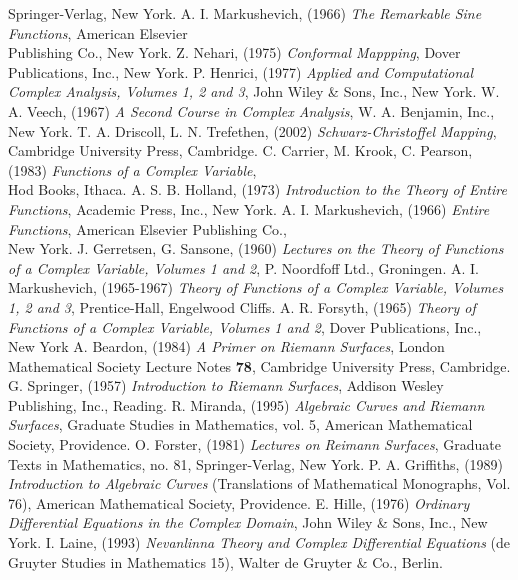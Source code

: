 \documentclass[11pt]{gthesis2}  %
\begin{document}
\begin{thebibliography}{99}
 Springer-Verlag, New York.
%
 A. I. Markushevich, (1966) \emph{The Remarkable Sine Functions},
 American Elsevier \\ Publishing Co., New York.
%
 Z. Nehari, (1975)
 \emph{Conformal Mappping},
 Dover Publications, Inc., New York.
%
 P. Henrici, (1977) \emph{Applied and Computational
 Complex Analysis, Volumes
 1, 2 and 3}, John Wiley \& Sons, Inc., New York.
%
 W. A. Veech, (1967)
 \emph{A Second Course in Complex Analysis},
 W. A. Benjamin, Inc., New York.
%
 T. A. Driscoll, L. N. Trefethen, (2002)
 \emph{Schwarz-Christoffel Mapping},
 Cambridge University Press, Cambridge.
%
 C. Carrier, M. Krook, C. Pearson, (1983)
 \emph{Functions of a Complex Variable},
 \\ Hod Books, Ithaca.
 A. S. B. Holland, (1973)
 \emph{Introduction to the Theory of Entire Functions},
 Academic Press, Inc., New York.
%
 A. I. Markushevich, (1966)
 \emph{Entire Functions},
 American Elsevier Publishing Co., \\ New York.
%
 J. Gerretsen, G. Sansone, (1960) \emph{Lectures on the Theory of Functions of a
 Complex Variable, Volumes
 1 and 2}, P. Noordfoff Ltd., Groningen.
%
 A. I. Markushevich, (1965-1967) \emph{Theory of Functions of a
 Complex Variable, Volumes
 1, 2 and 3}, Prentice-Hall, Engelwood Cliffs.
%
 A. R. Forsyth, (1965)
 \emph{Theory of Functions of a Complex Variable, Volumes 1 and 2},
 Dover Publications, Inc., New York
%
 A. Beardon, (1984) \emph{A Primer on Riemann Surfaces}, London
 Mathematical Society Lecture Notes \textbf{78}, Cambridge University
 Press, Cambridge.
%
 G. Springer, (1957) \emph{Introduction to Riemann Surfaces}, Addison
 Wesley Publishing, Inc., Reading.
%
 R. Miranda, (1995) \emph{Algebraic Curves and Riemann Surfaces},
 Graduate Studies in Mathematics, vol. 5, American Mathematical Society, Providence.
%
 O. Forster, (1981) \emph{Lectures on Reimann Surfaces}, Graduate
 Texts in Mathematics, no. 81, Springer-Verlag, New York.
%
 P. A. Griffiths, (1989) \emph{Introduction to Algebraic Curves}
  (Translations of Mathematical Monographs, Vol. 76), American
 Mathematical Society, Providence.
%
E. Hille, (1976) \emph{Ordinary Differential Equations in the
Complex Domain}, John Wiley \& Sons, Inc., New York.
%
I. Laine, (1993) \emph{Nevanlinna Theory and Complex Differential
Equations} (de Gruyter Studies in Mathematics 15), Walter de
Gruyter \& Co., Berlin.
%
%
\end{thebibliography}%
\end{document}

